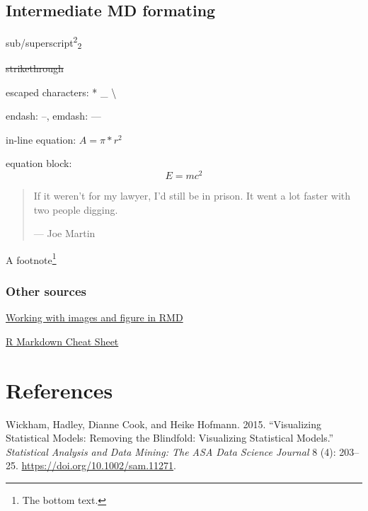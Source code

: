 \documentclass[11,]{article}
\let\rmarkdownfootnote\footnote%
\def\footnote{\protect\rmarkdownfootnote}
\begin{document}
\hypertarget{intermediate-md-formating}{%
\subsection{Intermediate MD formating}\label{intermediate-md-formating}}

sub/superscript\textsuperscript{2}\textsubscript{2}

\sout{strikethrough}

escaped characters: * \_ \textbackslash{}

endash: --, emdash: ---

in-line equation: \(A = \pi*r^{2}\)

equation block: \[E = mc^{2}\]

\begin{quote}
If it weren't for my lawyer, I'd still be in prison.
It went a lot faster with two people digging.

\hfill --- Joe Martin
\end{quote}

A footnote\footnote{The bottom text.}

\hypertarget{other-sources}{%
\subsubsection{Other sources}\label{other-sources}}

\href{http://zevross.com/blog/2017/06/19/tips-and-tricks-for-working-with-images-and-figures-in-r-markdown-documents/}{Working with images and figure in RMD}

\href{https://rstudio.com/wp-content/uploads/2016/03/rmarkdown-cheatsheet-2.0.pdf}{R Markdown Cheat Sheet}

\hypertarget{references}{%
\section*{References}\label{references}}

\hypertarget{refs}{}
\leavevmode\hypertarget{ref-wickham_visualizing_2015}{}%
Wickham, Hadley, Dianne Cook, and Heike Hofmann. 2015. ``Visualizing Statistical Models: Removing the Blindfold: Visualizing Statistical Models.'' \emph{Statistical Analysis and Data Mining: The ASA Data Science Journal} 8 (4): 203--25. \url{https://doi.org/10.1002/sam.11271}.
\end{document}
